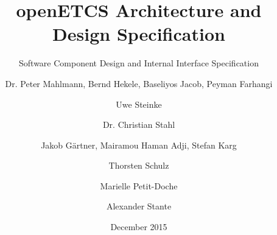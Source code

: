 \documentclass[oneside]{template/openetcs_report}
\begin{document}
\frontmatter
{}

\newcommand{\define}[1]{\index{#1}\emph{#1}}







\title{openETCS Architecture and Design Specification}

\subtitle{Software Component Design and Internal Interface Specification}

\date{December 2015}








\author{Dr. Peter Mahlmann, Bernd Hekele, Baseliyos Jacob, Peyman Farhangi}

\author{Uwe Steinke}

\author{Dr. Christian Stahl}

\author{Jakob G\"artner, Mairamou Haman Adji, Stefan Karg}


\author{Thorsten Schulz}

\author{Marielle Petit-Doche}



\author{Alexander Stante}
\end{document}
